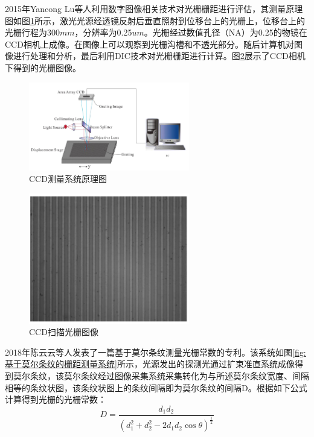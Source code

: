 \documentclass[type=master,oneside]{fduthesis}
\begin{document}
2015年Yancong Lu等人利用数字图像相关技术\cite{lu2016pitch,chen2014novel}对光栅栅距进行评估，其测量原理图如图\ref{fig:CCD测量系统原理图}所示，激光光源经透镜反射后垂直照射到位移台上的光栅上，位移台上的光栅行程为300$mm$，分辨率为0.25$um$。光栅经过数值孔径（NA）为0.25的物镜在CCD相机上成像。在图像上可以观察到光栅沟槽和不透光部分。随后计算机对图像进行处理和分析，最后利用DIC技术对光栅栅距进行计算。图\ref{fig:CCD扫描光栅图像}展示了CCD相机下得到的光栅图像。

\begin{figure}[htb]
  \centering
  \includegraphics[width=7cm]{1-fig/CCD.png}
  \caption{CCD测量系统原理图}
  \label{fig:CCD测量系统原理图}
\end{figure}

\begin{figure}[htb]
  \centering
  \includegraphics[width=7cm]{1-fig/光栅图像.png}
  \caption{CCD扫描光栅图像}
  \label{fig:CCD扫描光栅图像}
\end{figure}


2018年陈云云等人\cite{陈云云2019一种测量光栅常数的系统}发表了一篇基于莫尔条纹测量光栅常数的专利。该系统如图\ref{fig:基于莫尔条纹的栅距测量系统}所示，光源发出的探测光通过扩束准直系统成像得到莫尔条纹，该莫尔条纹经过图像采集系统采集转化为与所述莫尔条纹宽度、间隔相等的条纹状图，该条纹状图上的条纹间隔即为莫尔条纹的间隔D。根据如下公式计算得到光栅的光栅常数：
\begin{equation}
  D=\frac{d_{1} d_{2}}{\left(d_{1}^{2}+d_{2}^{2}-2 d_{1} d_{2} \cos \theta\right)^{\frac{1}{2}}}
\end{equation}
\end{document}
